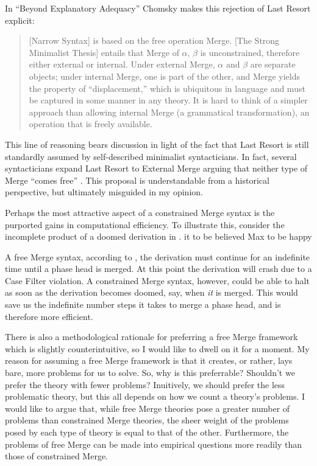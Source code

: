 \documentclass[MilwayThesis]{subfiles}
\begin{document}
In ``Beyond Explanatory Adequacy'' \parencite[][henceforth, \textit{BEA}]{chomsky2004beyond} Chomsky makes this rejection of Last Resort explicit:
\begin{quote}
	[Narrow Syntax] is based on the free operation Merge.
	[The Strong Minimalist Thesis] entails that Merge of $\alpha$, $\beta$ is unconstrained, therefore either external or internal.
	Under external Merge, $\alpha$ and $\beta$ are separate objects; 
	under internal Merge, one is part of the other, and Merge yields the property of ``displacement,'' which is ubiquitous in language and must be captured in some manner in any theory. 
	It is hard to think of a simpler approach than allowing	internal Merge (a grammatical transformation), an operation that is freely available.
	\parencite[110]{chomsky2004beyond}
\end{quote}
This line of reasoning bears discussion in light of the fact that Last Resort is still standardly assumed by self-described minimalist syntacticians.
In fact, several syntacticians expand Last Resort to External Merge arguing that neither type of Merge ``comes free'' \parencite{pesetsky2006probes,frampton2008crash,wurmbrand2014merge,yokoyama2015features}.
This proposal is understandable from a historical perspective, but ultimately misguided in my opinion.

Perhaps the most attractive aspect of a constrained Merge syntax is the purported gains in computational efficiency.
To illustrate this, \textcite{frampton2008crash} consider the incomplete product of a doomed derivation in \Next
\ex. it to be believed Max to be happy

A free Merge syntax, according to \textcite{frampton2008crash}, the derivation must continue for an indefinite time until a phase head is merged.
At this point the derivation will crash due to a Case Filter violation.
A constrained Merge syntax, however, could be able to halt as soon as the derivation becomes doomed, say, when \textit{it} is merged.
This would save us the indefinite number steps it takes to merge a phase head, and is therefore more efficient.

There is also a methodological rationale for preferring a free Merge framework which is slightly counterintuitive, so I would like to dwell on it for a moment.
My reason for assuming a free Merge framework is that it creates, or rather, lays bare, more problems for us to solve.
So, why is this preferrable?
Shouldn't we prefer the theory with fewer problems?
Inuitively, we should prefer the less problematic theory, but this all depends on how we count a theory's problems.
I would like to argue that, while free Merge theories pose a greater number of problems than constrained Merge theories, the sheer weight of the problems posed by each type of theory is equal to that of the other.
Furthermore, the problems of free Merge can be made into empirical questions more readily than those of constrained Merge.
\end{document}
